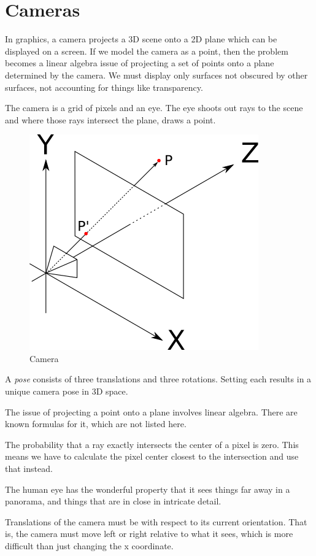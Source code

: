 \section{Cameras}

In graphics, a camera projects a 3D scene onto a 2D plane which
can be displayed on a screen. If we model the camera as a point,
then the problem becomes a linear algebra issue of projecting a
set of points onto a plane determined by the camera. We must
display only surfaces not obscured by other surfaces, not accounting
for things like transparency.

The camera is a grid of pixels and an eye. The eye shoots out rays
to the scene and where those rays intersect the plane, draws a point.

\begin{figure}
    \includegraphics{images/camera.png}
    \caption{Camera}
    \label{fig:camera}
\end{figure}

A \emph{pose} consists of three translations and three rotations.
Setting each results in a unique camera pose in 3D space.


The issue of projecting a point onto a plane involves linear algebra.
There are known formulas for it, which are not listed here.

The probability that a ray exactly intersects the center of a
pixel is zero.
This means we have to calculate the pixel center closest to the
intersection and use that instead.

The human eye has the wonderful property that it sees things far away
in a panorama, and things that are in close in intricate detail.

Translations of the camera must be with respect to its current orientation.
That is, the camera must move left or right relative to what it sees,
which is more difficult than just changing the x coordinate.